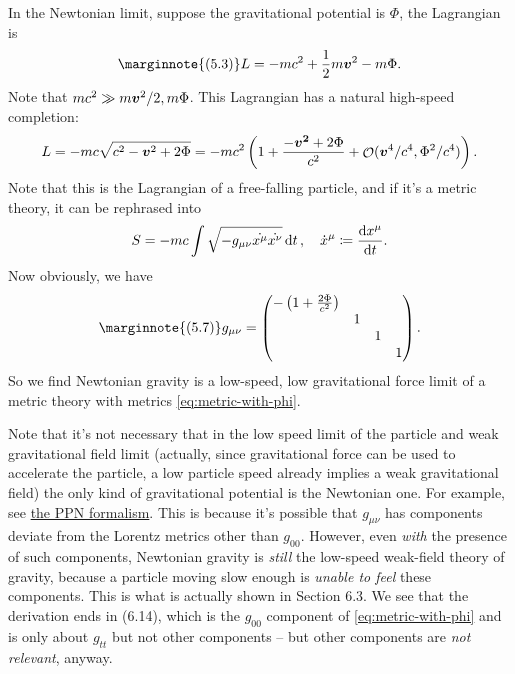 \documentclass[hyperref, a4paper]{article}
\DeclareMathOperator{\bigO}{\mathcal{O}}
\begin{document}
In the Newtonian limit, suppose the gravitational potential is $\Phi$, the Lagrangian is 
\begin{equation} \marginnote{(5.3)}
    L = - m c^2 + \frac{1}{2} m \vb*{v}^2 - m \Phi.
\end{equation}
Note that $m c^2 \gg m \vb*{v}^2 / 2, m \Phi$. 
This Lagrangian has a natural high-speed completion:
\begin{equation}
    L = - m c \sqrt{c^2 - \vb*{v}^2 + 2 \Phi} = - m c^2 \left( 1 + \frac{- \vb*{\vb*{v}^2} + 2 \Phi}{c^2} + \bigO(\vb*{v}^4 / c^4, \Phi^2 / c^4) \right) .
\end{equation}
Note that this is the Lagrangian of a free-falling particle, and if it's a metric theory, it can be rephrased into 
\begin{equation}
    S = - m c \int \sqrt{- g_{\mu \nu} \dot{x^\mu} \dot{x^\nu}} \dd{t}, \quad \dot{x}^\mu \coloneqq \dv{x^\mu}{t}.
\end{equation}
Now obviously, we have 
\begin{equation} \marginnote{(5.7)}
    g_{\mu \nu} = \pmqty{\dmat{ -\left(1 + \frac{2\Phi}{c^2}\right), 1, 1, 1 }}. \label{eq:metric-with-phi}
\end{equation}
So we find Newtonian gravity is a low-speed, low gravitational force limit of a metric theory with metrics
\eqref{eq:metric-with-phi}. 

Note that it's not necessary that in the low speed limit of the particle and weak gravitational field limit
(actually, since gravitational force can be used to accelerate the particle, a low particle speed already 
implies a weak gravitational field) the only kind of gravitational potential is the Newtonian one.
For example, see \href{https://en.wikipedia.org/wiki/Parameterized\_post-Newtonian\_formalism}{the PPN formalism}.
This is because it's possible that $g_{\mu \nu}$ has components deviate from the Lorentz metrics other 
than $g_{00}$. However, even \emph{with} the presence of such components, Newtonian gravity is \emph{still} 
the low-speed weak-field theory of gravity, because a particle moving slow enough is \emph{unable to feel} 
these components. This is what is actually shown in Section 6.3. 
We see that the derivation ends in (6.14), which is the $g_{00}$ component of \eqref{eq:metric-with-phi} 
and is only about $g_{tt}$ but not other components -- but other components are \emph{not relevant}, anyway.
\end{document}

